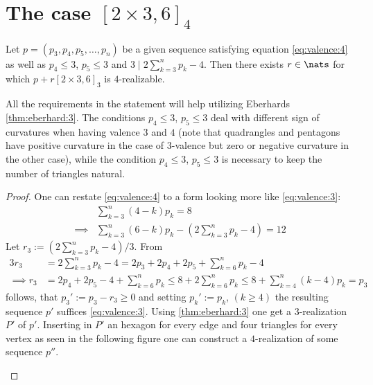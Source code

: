 \section{The case $[2 \times 3, 6]_4$}
\begin{lemma}
  Let $p = (p_3, p_4, p_5, \dots, p_n)$ be a given sequence satisfying equation \ref{eq:valence:4} as well as $p_4 \leq 3$, $p_5 \leq 3$ and $3 \mid 2 \sum_{k=3}^{n} p_k - 4$. Then there exists $r \in \nats$ for which $p + r [2 \times 3, 6]_3$ is $4$-realizable.

  All the requirements in the statement will help utilizing Eberhards \ref{thm:eberhard:3}. The conditions $p_4 \leq 3$, $p_5 \leq 3$ deal with different sign of curvatures when having valence $3$ and $4$ (note that quadrangles and pentagons have positive curvature in the case of $3$-valence but zero or negative curvature in the other case), while the condition $p_4 \leq 3$, $p_5 \leq 3$ is necessary to keep the number of triangles natural. 
  \begin{proof}
    One can restate \ref{eq:valence:4} to a form looking more like \ref{eq:valence:3}:
    \begin{align*}
      & \sum_{k=3}^n \left( 4 - k \right) p_k = 8 \\
      \implies & \sum_{k=3}^n \left( 6 - k \right) p_k - \left(2 \sum_{k=3}^n  p_k - 4 \right) = 12
    \end{align*}
    Let $r_3 := (2 \sum_{k=3}^{n} p_k - 4)/3$. From
    \begin{align*}
      3 r_3 &= 2 \sum_{k=3}^{n} p_k - 4 =  2 p_3 + 2 p_4 + 2 p_5 + \sum_{k=6}^{n} p_k - 4\\
      \implies r_3 &= 2 p_4 + 2 p_5 - 4 + \sum_{k=6}^{n} p_k \leq 8 + 2 \sum_{k=6}^{n} p_k \leq 8 + \sum_{k=4}^{n} (k - 4) p_k = p_3
    \end{align*}
    follows, that $p_3' := p_3 - r_3 \geq 0$ and setting $p_k' := p_k$, $(k \geq 4)$ the resulting sequence $p'$ suffices \ref{eq:valence:3}. Using \ref{thm:eberhard:3} one get a $3$-realization $P'$ of $p'$. Inserting in $P'$ an hexagon for every edge and four triangles for every vertex as seen in the following figure one can construct a $4$-realization of some sequence $p''$.
    \begin{figure}[htpp]
      \centering
\end{figure}
\end{proof}
\end{lemma}
